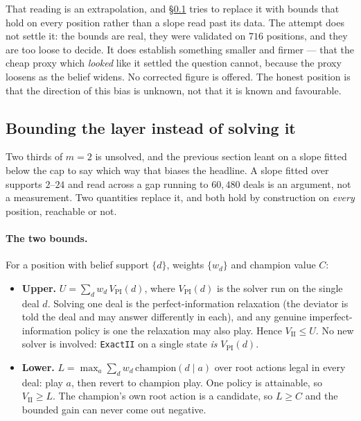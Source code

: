 \documentclass[11pt,letterpaper]{article}
\begin{document}
That reading is an extrapolation, and \S\ref{sec:iibounds} tries to replace it
with bounds that hold on every position rather than a slope read past its data.
The attempt does not settle it: the bounds are real, they were validated on
$716$ positions, and they are too loose to decide. It does establish something
smaller and firmer --- that the cheap proxy which \emph{looked} like it settled
the question cannot, because the proxy loosens as the belief widens. No
corrected figure is offered. The honest position is that the direction of this
bias is unknown, not that it is known and favourable.

\subsection{Bounding the layer instead of solving it}
\label{sec:iibounds}

Two thirds of $m = 2$ is unsolved, and the previous section leant on a slope
fitted below the cap to say which way that biases the headline. A slope
fitted over supports $2$--$24$ and read across a gap running to $60{,}480$
deals is an argument, not a measurement. Two quantities replace it, and both
hold by construction on \emph{every} position, reachable or not.

\paragraph{The two bounds.} For a position with belief support $\{d\}$,
weights $\{w_d\}$ and champion value $C$:

\begin{itemize}
\item \textbf{Upper.} $U = \sum_d w_d\,V_{\mathrm{PI}}(d)$, where
  $V_{\mathrm{PI}}(d)$ is the solver run on the single deal $d$. Solving one
  deal is the perfect-information relaxation (the deviator is told the deal
  and may answer differently in each), and any genuine
  imperfect-information policy is one the relaxation may also play. Hence
  $V_{\mathrm{II}} \le U$. No new solver is involved: \texttt{ExactII} on a
  single state \emph{is} $V_{\mathrm{PI}}(d)$.
\item \textbf{Lower.} $L = \max_a \sum_d w_d\,\mathrm{champion}(d \mid a)$
  over root actions legal in every deal: play $a$, then revert to champion
  play. One policy is attainable, so $V_{\mathrm{II}} \ge L$. The champion's
  own root action is a candidate, so $L \ge C$ and the bounded gain can never
  come out negative.
\end{itemize}
\end{document}
